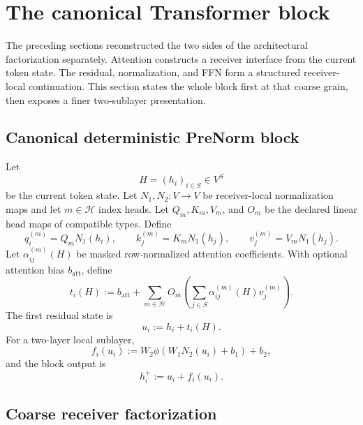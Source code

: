 \section{The canonical Transformer block}\label{sec:full-block}

The preceding sections reconstructed the two sides of the architectural factorization separately. Attention constructs a receiver interface from the current token state. The residual, normalization, and FFN form a structured receiver-local continuation. This section states the whole block first at that coarse grain, then exposes a finer two-sublayer presentation.

\subsection{Canonical deterministic PreNorm block}

Let
\[
H=(h_i)_{i\in S}\in V^S
\]
be the current token state. Let $N_1,N_2:V\to V$ be receiver-local normalization maps and let $m\in\mathcal H$ index heads. Let $Q_m,K_m,V_m$, and $O_m$ be the declared linear head maps of compatible types. Define
\[
q_i^{(m)}=Q_mN_1(h_i),
\qquad
k_j^{(m)}=K_mN_1(h_j),
\qquad
v_j^{(m)}=V_mN_1(h_j).
\]
Let $\alpha_{ij}^{(m)}(H)$ be masked row-normalized attention coefficients. With optional attention bias $b_{\mathrm{att}}$, define
\begin{equation}\label{eq:token-route}
t_i(H)
:=
b_{\mathrm{att}}
+
\sum_{m\in\mathcal H}O_m\left(\sum_{j\in S}\alpha_{ij}^{(m)}(H)v_j^{(m)}\right).
\end{equation}
The first residual state is
\begin{equation}\label{eq:first-residual}
u_i:=h_i+t_i(H).
\end{equation}
For a two-layer local sublayer,
\begin{equation}\label{eq:local-ffn-block}
f_i(u_i):=W_2\phi(W_1N_2(u_i)+b_1)+b_2,
\end{equation}
and the block output is
\begin{equation}\label{eq:block-output}
h_i^+:=u_i+f_i(u_i).
\end{equation}

\subsection{Coarse receiver factorization}

